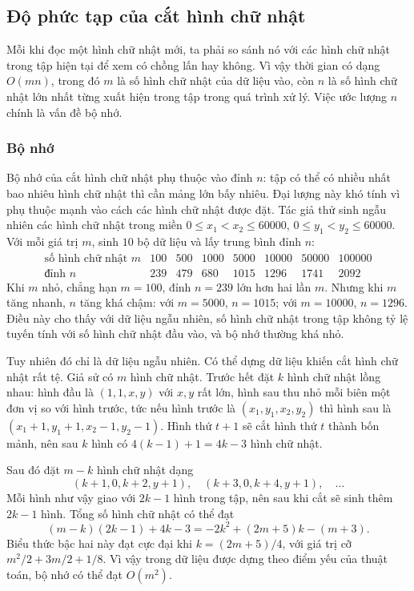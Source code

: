 \documentclass[11pt]{article}
\begin{document}
\subsection{Độ phức tạp của cắt hình chữ nhật}

Mỗi khi đọc một hình chữ nhật mới, ta phải so sánh nó với các hình chữ nhật
trong tập hiện tại để xem có chồng lấn hay không. Vì vậy thời gian có dạng
$O(mn)$, trong đó $m$ là số hình chữ nhật của dữ liệu vào, còn $n$ là số hình
chữ nhật lớn nhất từng xuất hiện trong tập trong quá trình xử lý. Việc ước
lượng $n$ chính là vấn đề bộ nhớ.

\subsubsection{Bộ nhớ}

Bộ nhớ của cắt hình chữ nhật phụ thuộc vào đỉnh $n$: tập có thể có nhiều nhất
bao nhiêu hình chữ nhật thì cần mảng lớn bấy nhiêu. Đại lượng này khó tính vì
phụ thuộc mạnh vào cách các hình chữ nhật được đặt. Tác giả thử sinh ngẫu
nhiên các hình chữ nhật trong miền
$0\le x_1<x_2\le 60000$, $0\le y_1<y_2\le 60000$. Với mỗi giá trị $m$, sinh
$10$ bộ dữ liệu và lấy trung bình đỉnh $n$:
\[
\begin{array}{c|rrrrrrr}
\text{số hình chữ nhật }m & 100 & 500 & 1000 & 5000 & 10000 & 50000 & 100000\\
\hline
\text{đỉnh }n & 239 & 479 & 680 & 1015 & 1296 & 1741 & 2092
\end{array}
\]
Khi $m$ nhỏ, chẳng hạn $m=100$, đỉnh $n=239$ lớn hơn hai lần $m$. Nhưng khi
$m$ tăng nhanh, $n$ tăng khá chậm: với $m=5000$, $n=1015$; với $m=10000$,
$n=1296$. Điều này cho thấy với dữ liệu ngẫu nhiên, số hình chữ nhật trong
tập không tỷ lệ tuyến tính với số hình chữ nhật đầu vào, và bộ nhớ thường
khá nhỏ.

Tuy nhiên đó chỉ là dữ liệu ngẫu nhiên. Có thể dựng dữ liệu khiến cắt hình
chữ nhật rất tệ. Giả sử có $m$ hình chữ nhật. Trước hết đặt $k$ hình chữ nhật
lồng nhau: hình đầu là $(1,1,x,y)$ với $x,y$ rất lớn, hình sau thu nhỏ mỗi
biên một đơn vị so với hình trước, tức nếu hình trước là
$(x_1,y_1,x_2,y_2)$ thì hình sau là
$(x_1+1,y_1+1,x_2-1,y_2-1)$. Hình thứ $t+1$ sẽ cắt hình thứ $t$ thành bốn
mảnh, nên sau $k$ hình có $4(k-1)+1=4k-3$ hình chữ nhật.

Sau đó đặt $m-k$ hình chữ nhật dạng
\[
  (k+1,0,k+2,y+1),\quad (k+3,0,k+4,y+1),\quad \ldots
\]
Mỗi hình như vậy giao với $2k-1$ hình trong tập, nên sau khi cắt sẽ sinh thêm
$2k-1$ hình. Tổng số hình chữ nhật có thể đạt
\[
  (m-k)(2k-1)+4k-3
  =-2k^2+(2m+5)k-(m+3).
\]
Biểu thức bậc hai này đạt cực đại khi $k=(2m+5)/4$, với giá trị cỡ
$m^2/2+3m/2+1/8$. Vì vậy trong dữ liệu được dựng theo điểm yếu của thuật
toán, bộ nhớ có thể đạt $O(m^2)$.
\end{document}
